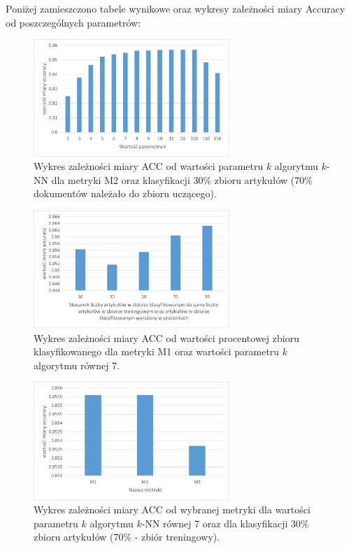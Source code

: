 \documentclass{classrep}
\begin{document}
Poniżej zamieszczono tabele wynikowe oraz wykresy zależności miary Accuracy od poszczególnych parametrów:

\begin{figure}[H]
\centering
\includegraphics[width=0.66\textwidth]{wykres5.png}
\caption{Wykres zależności miary ACC od wartości parametru \(k\) algorytmu \(k\)-NN dla metryki M2 oraz klasyfikacji 30\% zbioru artykułów (70\% dokumentów należało do zbioru uczącego).}
\end{figure}

\begin{figure}[H]
\centering
\includegraphics[width=0.66\textwidth]{wykres6.png}
\caption{Wykres zależności miary ACC od wartości procentowej zbioru klasyfikowanego dla metryki M1 oraz wartości parametru \(k\) algorytmu równej 7.}
\end{figure}

\begin{figure}[H]
\centering
\includegraphics[width=0.66\textwidth]{wykres7.png}
\caption{Wykres zależności miary ACC od wybranej metryki dla wartości parametru \(k\) algorytmu \(k\)-NN równej 7 oraz dla klasyfikacji 30\% zbioru artykułów (70\% - zbiór treningowy).}
\end{figure}
\end{document}
